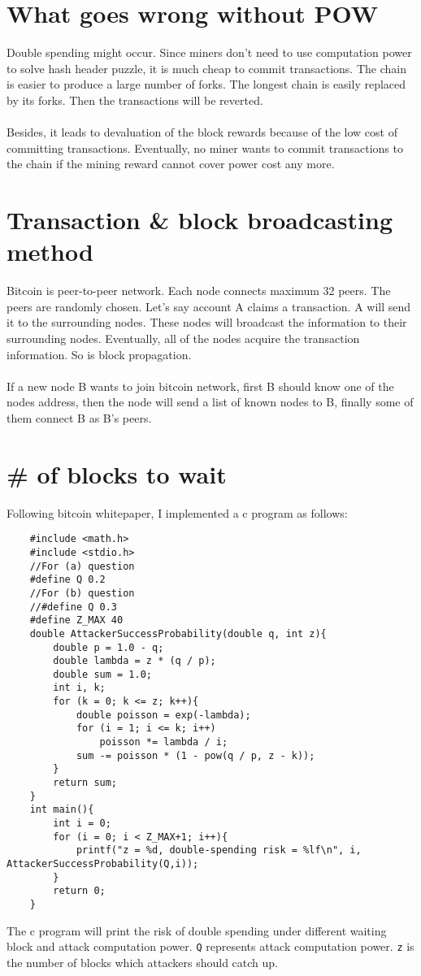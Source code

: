 \documentclass{article}
\begin{document}
\section{What goes wrong without POW}
Double spending might occur. Since miners don't need to use computation power to solve hash header puzzle, it is much cheap to commit transactions. The chain is easier to produce a large number of forks. The longest chain is easily replaced by its forks. Then the transactions will be reverted.\\\\
Besides, it leads to devaluation of the block rewards because of the low cost of committing transactions. Eventually, no miner wants to commit transactions to the chain if the mining reward cannot cover power cost any more.
\section{Transaction \& block broadcasting method}
Bitcoin is peer-to-peer network. Each node connects maximum 32 peers. The peers are randomly chosen. Let's say account A claims a transaction. A will send it to the surrounding nodes. These nodes will broadcast the information to their surrounding nodes. Eventually, all of the nodes acquire the transaction information. So is block propagation.\\\\
If a new node B wants to join bitcoin network, first B should know one of the nodes address, then the node will send a list of known nodes to B, finally some of them connect B as B's peers.
\section{\# of blocks to wait}
Following bitcoin whitepaper, I implemented a c program as follows:
\begin{verbatim}
    #include <math.h>
    #include <stdio.h>
    //For (a) question
    #define Q 0.2
    //For (b) question
    //#define Q 0.3
    #define Z_MAX 40
    double AttackerSuccessProbability(double q, int z){
        double p = 1.0 - q;
        double lambda = z * (q / p);
        double sum = 1.0;
        int i, k;
        for (k = 0; k <= z; k++){
            double poisson = exp(-lambda);
            for (i = 1; i <= k; i++)
                poisson *= lambda / i;
            sum -= poisson * (1 - pow(q / p, z - k));
        }
        return sum; 
    }
    int main(){
        int i = 0;
        for (i = 0; i < Z_MAX+1; i++){
            printf("z = %d, double-spending risk = %lf\n", i, AttackerSuccessProbability(Q,i));
        }
        return 0;
    }
\end{verbatim}
The c program will print the risk of double spending under different waiting block and attack computation power. \verb|Q| represents attack computation power. \verb|z| is the number of blocks which attackers should catch up.
\end{document}
